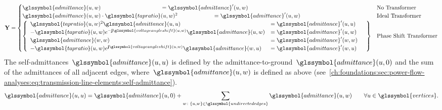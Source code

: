 \begin{equation}
    \admittanceMatrix
    = 
    \begin{cases}
        \glssymbol{admittance}(\vertexa,\vertexc) \hspace{3.7cm}= 
        \glssymbol{admittance}'(\vertexa,\vertexc) &\text{No Transformer}
        \\
        \glssymbol{admittance}(\vertexa,\vertexc)\cdot \glssymbol{tapratio}
        (\vertexa,\vertexc)^2 \hspace{2.17cm}= \glssymbol{admittance}'(\vertexa,\vertexc)&
        \text{Ideal Transformer}
        \\
        \left\{
            \begin{array}{lll}
                \glssymbol{tapratio}(\vertexa,\vertexc)^2\glssymbol{admittance}
                (\vertexa,\vertexa) &= \glssymbol{admittance}'(\vertexa,\vertexa)&
                \\
                -\glssymbol{tapratio}(\vertexa,\vertexc) e^
                {-\imgPart\glssymbol{voltageangleshift}
                (\vertexa,\vertexc)}\glssymbol{admittance}
                (\vertexa,\vertexc) &= \glssymbol{admittance}'(\vertexa,\vertexc)&
                \\
                \glssymbol{admittance}(\vertexc,\vertexc) &= \glssymbol{admittance}'(\vertexc,\vertexc)&
                \\
                -\glssymbol{tapratio}(\vertexa,\vertexc)
                e^{\imgPart\glssymbol{voltageangleshift}(\vertexa,\vertexc)}
                \glssymbol{admittance}(\vertexc,\vertexa) &= \glssymbol{admittance}'(\vertexc,\vertexa)&
            \end{array}
        \right\}&\text{Phase Shift Transformer}
    \end{cases}%
    \label{ch:foundations:sec:power-flow-analyses:eq:transmission-line-elements:admittance}
\end{equation}%
% 
The self-admittances~$\glssymbol{admittance}(\vertexa,\vertexa)$ is defined by
the admittance-to-ground~$\glssymbol{admittance}(\vertexa,0)$ and the sum of the
admittances of all adjacent edges,
where~$\glssymbol{admittance}(\vertexa,\vertexc)$ is defined as above
(see~\cref{ch:foundations:sec:power-flow-analyses:eq:transmission-line-elements:self-admittance}).
%
\begin{equation}%
    \glssymbol{admittance}(\vertexa,\vertexa) = \glssymbol{admittance}(\vertexa,0) + \sum_{ 
    \vertexc\colon\{\vertexa,\vertexc\}\in\glssymbol{undirectededges} } \glssymbol{admittance}
    (\vertexa,\vertexc)\qquad\forall\vertexa\in\glssymbol{vertices}.
    \label{ch:foundations:sec:power-flow-analyses:eq:transmission-line-elements:self-admittance}
\end{equation}%
